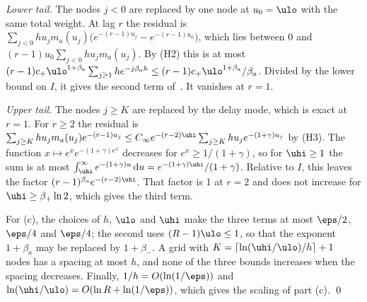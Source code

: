 \emph{Lower tail.} The nodes $j<0$ are replaced by one node at $u_0=\ulo$ with the same total weight. At lag $r$ the residual is $\sum_{j<0}hu_jm_a(u_j)\big(e^{-(r-1)u_j}-e^{-(r-1)u_0}\big)$, which lies between 0 and $(r-1)u_0\sum_{j<0}hu_jm_a(u_j)$. By (H2) this is at most $(r-1)c_+\ulo^{1+\beta_a}\sum_{j\ge1}he^{-j\beta_ah}\le(r-1)c_+\ulo^{1+\beta_a}/\beta_a$. Divided by the lower bound on $I$, it gives the second term of~. It vanishes at $r=1$.

\emph{Upper tail.} The nodes $j\ge K$ are replaced by the delay mode, which is exact at $r=1$. For $r\ge2$ the residual is $\sum_{j\ge K}hu_jm_a(u_j)e^{-(r-1)u_j}\le C_\infty e^{-(r-2)\uhi}\sum_{j\ge K}hu_je^{-(1+\gamma)u_j}$ by (H3). The function $x\mapsto e^xe^{-(1+\gamma)e^x}$ decreases for $e^x\ge1/(1+\gamma)$, so for $\uhi\ge1$ the sum is at most $\int_{\uhi}^\infty e^{-(1+\gamma)u}\,\mathrm du=e^{-(1+\gamma)\uhi}/(1+\gamma)$. Relative to $I$, this leaves the factor $(r-1)^{\beta_a}e^{-(r-2)\uhi}$. That factor is 1 at $r=2$ and does not increase for $\uhi\ge\beta_+\ln2$, which gives the third term.

For (c), the choices of $h$, $\ulo$ and $\uhi$ make the three terms at most $\eps/2$, $\eps/4$ and $\eps/4$; the second uses $(R-1)\ulo\le1$, so that the exponent $1+\beta_a$ may be replaced by $1+\beta_-$. A grid with $K=\lceil\ln(\uhi/\ulo)/h\rceil+1$ nodes has a spacing at most $h$, and none of the three bounds increases when the spacing decreases. Finally, $1/h=O(\ln(1/\eps))$ and $\ln(\uhi/\ulo)=O(\ln R+\ln(1/\eps))$, which gives the scaling of part (c). \qed

